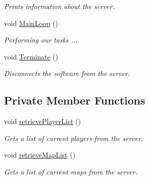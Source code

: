 \begin{DoxyCompactItemize}
\begin{DoxyCompactList}\small\item\em Prints information about the server. \end{DoxyCompactList}\item 
\hypertarget{classManiaPP_a8dff9e8e3835c3cac0df105a7bcce43c}{void \hyperlink{classManiaPP_a8dff9e8e3835c3cac0df105a7bcce43c}{Main\-Loop} ()}\label{classManiaPP_a8dff9e8e3835c3cac0df105a7bcce43c}

\begin{DoxyCompactList}\small\item\em Performing our tasks ... \end{DoxyCompactList}\item 
\hypertarget{classManiaPP_a87fd53fffe4a1840834a90ab575f5ce6}{void \hyperlink{classManiaPP_a87fd53fffe4a1840834a90ab575f5ce6}{Terminate} ()}\label{classManiaPP_a87fd53fffe4a1840834a90ab575f5ce6}

\begin{DoxyCompactList}\small\item\em Disconnects the software from the server. \end{DoxyCompactList}\end{DoxyCompactItemize}
\subsection*{Private Member Functions}
\begin{DoxyCompactItemize}
\item 
\hypertarget{classManiaPP_aede94c0b982250de19186d447542e479}{void \hyperlink{classManiaPP_aede94c0b982250de19186d447542e479}{retrieve\-Player\-List} ()}\label{classManiaPP_aede94c0b982250de19186d447542e479}

\begin{DoxyCompactList}\small\item\em Gets a list of current players from the server. \end{DoxyCompactList}\item 
\hypertarget{classManiaPP_a18582fa28b259c22a8a8d526af62123a}{void \hyperlink{classManiaPP_a18582fa28b259c22a8a8d526af62123a}{retrieve\-Map\-List} ()}\label{classManiaPP_a18582fa28b259c22a8a8d526af62123a}

\begin{DoxyCompactList}\small\item\em Gets a list of current maps from the server. \end{DoxyCompactList}\end{DoxyCompactItemize}

